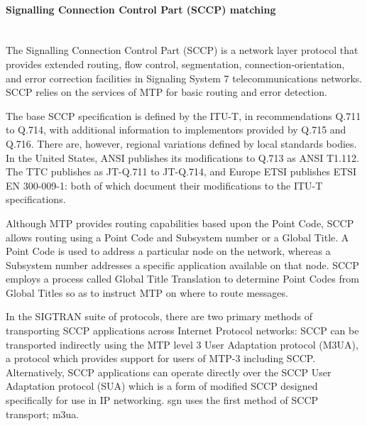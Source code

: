 \documentclass[a4paper,latin]{paper}
\begin{document}
\paragraph{Signalling Connection Control Part (SCCP) matching}
\mbox{}\\
The Signalling Connection Control Part (SCCP) is a network layer protocol that provides extended routing, flow control, segmentation, connection-orientation, 
and error correction facilities in Signaling System 7 telecommunications networks. SCCP relies on the services of MTP for basic routing and error detection.

The base SCCP specification is defined by the ITU-T, in recommendations Q.711 to Q.714, with additional information to implementors provided by Q.715 and Q.716. 
There are, however, regional variations defined by local standards bodies. In the United States, ANSI publishes its modifications to Q.713 as ANSI T1.112. 
The TTC publishes as JT-Q.711 to JT-Q.714, and Europe ETSI publishes ETSI EN 300-009-1: both of which document their modifications to the ITU-T specifications.

Although MTP provides routing capabilities based upon the Point Code, SCCP allows routing using a Point Code and Subsystem number or a Global Title.
A Point Code is used to address a particular node on the network, whereas a Subsystem number addresses a specific application available on that node. SCCP employs 
a process called Global Title Translation to determine Point Codes from Global Titles so as to instruct MTP on where to route messages.

In the SIGTRAN suite of protocols, there are two primary methods of transporting SCCP applications across Internet Protocol networks: SCCP can be transported 
indirectly using the MTP level 3 User Adaptation protocol (M3UA), a protocol which provides support for users of MTP-3 including SCCP. Alternatively, SCCP applications 
can operate directly over the SCCP User Adaptation protocol (SUA) which is a form of modified SCCP designed specifically for use in IP networking.
\acrfull{sgn} uses the first method of SCCP transport; \acrfull{m3ua}.\\
\end{document}
